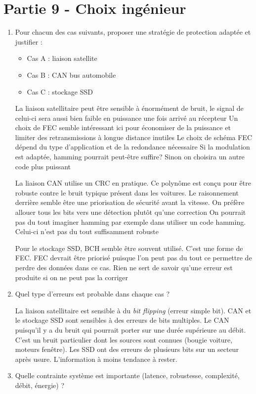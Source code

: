 \documentclass{article}
\begin{document}
\section{Partie 9 - Choix ingénieur}

\begin{enumerate}
	\item Pour chacun des cas suivants, proposer une stratégie de protection adaptée et justifier : 
		\begin{itemize}
	\item Cas A : liaison satellite 
	\item Cas B : CAN bus automobile 
	\item Cas C : stockage SSD 
		\end{itemize}


La liaison satellitaire peut être sensible à énormément de bruit, le signal de celui-ci sera aussi bien faible
en puissance une fois arrivé au récepteur
Un choix de FEC semble intéressant ici pour économiser de la puissance et limiter des 
retransmissions à longue distance inutiles
Le choix de schéma FEC dépend du type d'application et de la redondance nécessaire
Si la modulation est adaptée, hamming pourrait peut-être suffire? Sinon on choisira un autre code plus puissant

La liaison CAN utilise un CRC en pratique.
Ce polynôme est conçu pour être robuste contre le bruit typique présent dans les voitures.
Le raisonnement derrière semble être une priorisation de sécurité avant la vitesse.
On préfère allouer tous les bits vers une détection plutôt qu'une correction
On pourrait pas du tout imaginer hamming par exemple dans utiliser un code hamming.
Celui-ci n'est pas du tout suffisamment robuste

Pour le stockage SSD, BCH semble être souvent utilisé. C'est une forme de FEC.
FEC devrait être priorisé puisque l'on peut pas du tout ce permettre de perdre des données dans ce cas.
Rien ne sert de savoir qu'une erreur est produite si on ne peut pas la corriger
\item Quel type d’erreurs est probable dans chaque cas ? 

	La liaison satellitaire est sensible à du \textit{bit flipping} (erreur simple bit).
	CAN et le stockage SSD sont sensibles à des erreurs de bits multiples.
	Le CAN puisqu'il y a du bruit qui pourrait porter sur une durée supérieure au débit.
	C'est un bruit particulier dont les sources sont connues (bougie voiture, moteurs fenêtre).
	Les SSD ont des erreurs de plusieurs bits sur un secteur après usure. L'information à moins tendance à rester.
\item Quelle contrainte système est importante (latence, robustesse, complexité, débit, énergie) ?


\end{enumerate}
\end{document}
